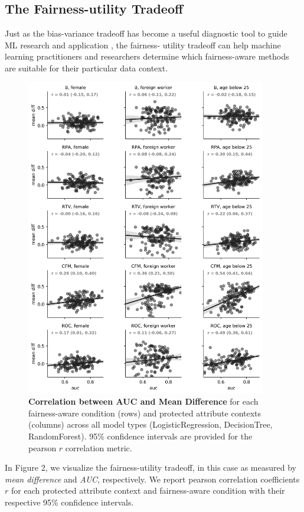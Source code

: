 \documentclass{interact}
\begin{document}
\subsection{The Fairness-utility Tradeoff}

Just as the bias-variance tradeoff has become a useful diagnostic tool to guide
ML research and application \cite{fortmann2012understanding}, the fairness-
utility tradeoff can help machine learning practitioners and researchers
determine which fairness-aware methods are suitable for their particular data
context.

\begin{figure}[h]
\centering
\includegraphics[width=10.5cm]{fairness_utility_tradeoff.png}
\caption{
  \textbf{Correlation between AUC and Mean Difference} for each fairness-aware
  condition (rows) and protected attribute contexts (columns) across all model
  types (LogisticRegression, DecisionTree,   RandomForest). 95\% confidence
  intervals are provided for the pearson \(r\) correlation metric.}
\label{figure-2-fairness-utility-tradeoff}
\end{figure}

In Figure 2, we visualize the fairness-utility tradeoff, in this case as
measured by \emph{mean difference} and \emph{AUC}, respectively. We report
pearson correlation coefficients \(r\) for each protected attribute context and
fairness-aware condition with their respective 95\% confidence intervals.
\end{document}
